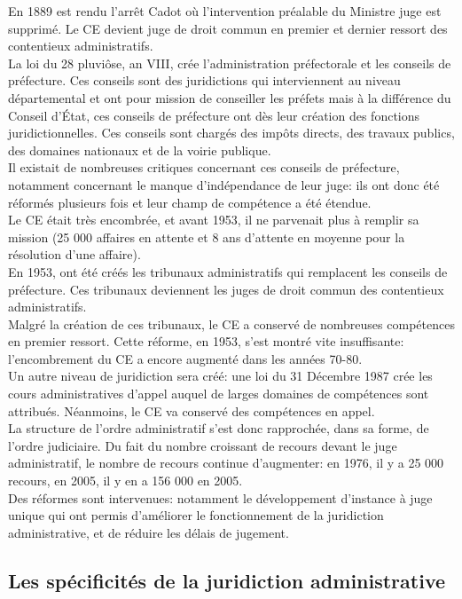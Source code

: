 \documentclass[12pt, a4paper, openany]{book}
\begin{document}
En 1889 est rendu l'arrêt Cadot où l'intervention préalable du Ministre juge est supprimé. Le CE devient juge de droit commun en premier et dernier ressort des contentieux administratifs. \\
La loi du 28 pluviôse, an VIII, crée l'administration préfectorale et les conseils de préfecture. Ces conseils sont des juridictions qui interviennent au niveau départemental et ont pour mission de conseiller les préfets mais à la différence du Conseil d'État, ces conseils de préfecture ont dès leur création des fonctions juridictionnelles. Ces conseils sont chargés des impôts directs, des travaux publics, des domaines nationaux et de la voirie publique. \\
Il existait de nombreuses critiques concernant ces conseils de préfecture, notamment concernant le manque d'indépendance de leur juge: ils ont donc été réformés plusieurs fois et leur champ de compétence a été étendue. \\
Le CE était très encombrée, et avant 1953, il ne parvenait plus à remplir sa mission (25 000 affaires en attente et 8 ans d'attente en moyenne pour la résolution d'une affaire). \\
En 1953, ont été créés les tribunaux administratifs qui remplacent les conseils de préfecture. Ces tribunaux deviennent les juges de droit commun des contentieux administratifs. \\
Malgré la création de ces tribunaux, le CE a conservé de nombreuses compétences en premier ressort. Cette réforme, en 1953, s'est montré vite insuffisante: l'encombrement du CE a encore augmenté dans les années 70-80. \\
Un autre niveau de juridiction sera créé: une loi du 31 Décembre 1987 crée les cours administratives d'appel auquel de larges domaines de compétences sont attribués. Néanmoins, le CE va conservé des compétences en appel. \\
La structure de l'ordre administratif s'est donc rapprochée, dans sa forme, de l'ordre judiciaire. Du fait du nombre croissant de recours devant le juge administratif, le nombre de recours continue d'augmenter: en 1976, il y a 25 000 recours, en 2005, il y en a 156 000 en 2005. \\
Des réformes sont intervenues: notamment le développement d'instance à juge unique qui ont permis d'améliorer le fonctionnement de la juridiction administrative, et de réduire les délais de jugement. 


\subsection{Les spécificités de la juridiction administrative} 
\end{document}
